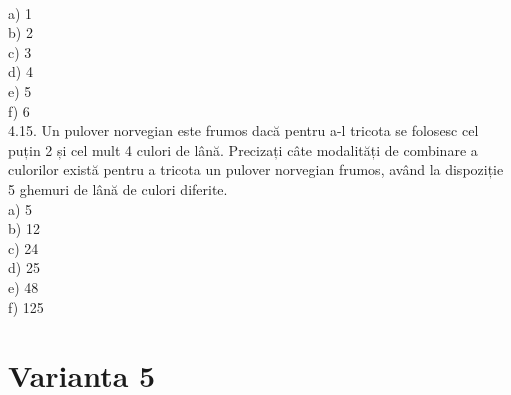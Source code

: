 \\
a) 1
\\
b) 2
\\
c) 3
\\
d) 4
\\
e) 5
\\
f) 6
\\
4.15. Un pulover norvegian este frumos dacă pentru a-l tricota se folosesc cel puțin 2 și cel mult 4 culori de lână. Precizați câte modalități de combinare a culorilor există pentru a tricota un pulover norvegian frumos, având la dispoziție 5 ghemuri de lână de culori diferite.
\\
a) 5
\\
b) 12
\\
c) 24
\\
d) 25
\\
e) 48
\\
f) 125
\\

\section*{Varianta 5}


